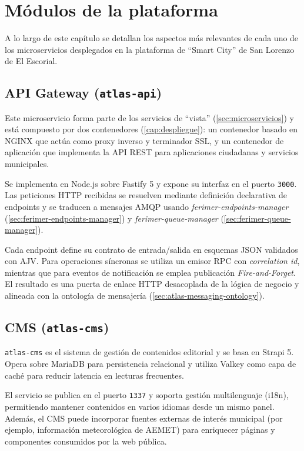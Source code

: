 \chapter{Módulos de la plataforma}
\label{cap:modulos}

A lo largo de este capítulo se detallan los aspectos más relevantes de cada uno de los microservicios desplegados en la plataforma de ``Smart City'' de San Lorenzo de El Escorial.

\section{API Gateway (\texttt{atlas-api})}

Este microservicio forma parte de los servicios de ``vista'' (\ref{sec:microservicios}) y está compuesto por dos contenedores (\ref{cap:despliegue}): un contenedor basado en NGINX que actúa como proxy inverso y terminador SSL, y un contenedor de aplicación que implementa la API REST para aplicaciones ciudadanas y servicios municipales.

Se implementa en Node.js sobre Fastify 5 y expone su interfaz en el puerto \texttt{3000}. Las peticiones HTTP recibidas se resuelven mediante definición declarativa de endpoints y se traducen a mensajes AMQP usando \textit{ferimer-endpoints-manager} (\ref{sec:ferimer-endpoints-manager}) y \textit{ferimer-queue-manager} (\ref{sec:ferimer-queue-manager}).

Cada endpoint define su contrato de entrada/salida en esquemas JSON validados con AJV. Para operaciones síncronas se utiliza un emisor RPC con \textit{correlation id}, mientras que para eventos de notificación se emplea publicación \textit{Fire-and-Forget}. El resultado es una puerta de enlace HTTP desacoplada de la lógica de negocio y alineada con la ontología de mensajería (\ref{sec:atlas-messaging-ontology}).

\section{CMS (\texttt{atlas-cms})}

\texttt{atlas-cms} es el sistema de gestión de contenidos editorial y se basa en Strapi 5. Opera sobre MariaDB para persistencia relacional y utiliza Valkey como capa de caché para reducir latencia en lecturas frecuentes.

El servicio se publica en el puerto \texttt{1337} y soporta gestión multilenguaje (i18n), permitiendo mantener contenidos en varios idiomas desde un mismo panel. Además, el CMS puede incorporar fuentes externas de interés municipal (por ejemplo, información meteorológica de AEMET) para enriquecer páginas y componentes consumidos por la web pública.

